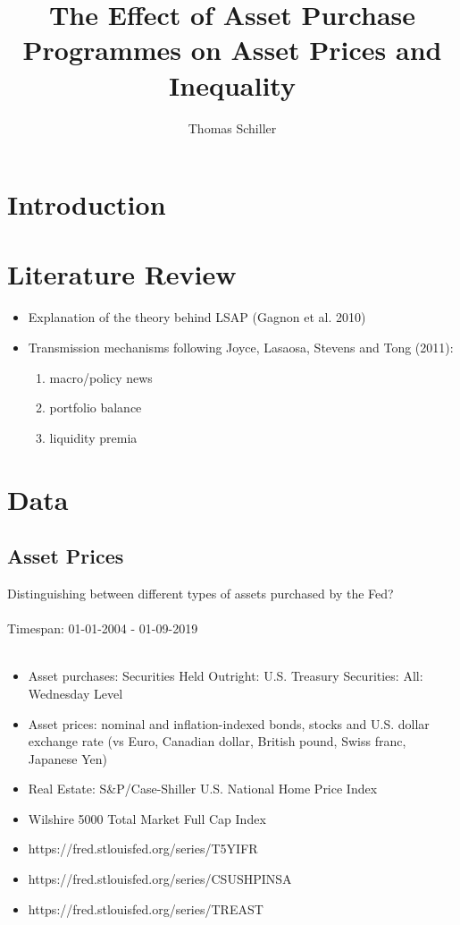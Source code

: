 \documentclass{article}
\title{The Effect of Asset Purchase Programmes on Asset Prices and Inequality}
\author{Thomas Schiller}
\begin{document}
\maketitle{}
\section{Introduction}

\section{Literature Review}
\begin{itemize}
  \item Explanation of the theory behind LSAP (Gagnon et al. 2010)
  \item Transmission mechanisms following Joyce, Lasaosa, Stevens and Tong (2011):
  \begin{enumerate}
    \item macro/policy news
    \item portfolio balance
    \item liquidity premia
  \end{enumerate}
\end{itemize}

\section{Data}
\subsection{Asset Prices}
Distinguishing between different types of assets purchased by the Fed?\\
\\
Timespan: 01-01-2004 - 01-09-2019\\
\\
\begin{itemize}
  \item Asset purchases: Securities Held Outright: U.S. Treasury Securities: All: Wednesday Level
  \item Asset prices: nominal and inflation-indexed bonds, stocks and U.S. dollar exchange rate (vs Euro, Canadian dollar, British pound, Swiss franc, Japanese Yen)
  \item Real Estate: S\&P/Case-Shiller U.S. National Home Price Index
  \item Wilshire 5000 Total Market Full Cap Index
  \item https://fred.stlouisfed.org/series/T5YIFR
  \item https://fred.stlouisfed.org/series/CSUSHPINSA
  \item https://fred.stlouisfed.org/series/TREAST

\end{itemize}
\end{document}
